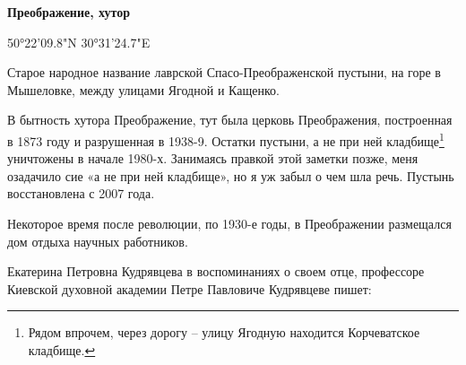 \medskip


\textbf{Преображение, хутор} 

50°22'09.8"N 30°31'24.7"E

Старое народное название лаврской Спасо-Преображенской пустыни, на горе в Мышеловке, между улицами Ягодной и Кащенко. 

В бытность хутора Преображение, тут была церковь Преображения, построенная в 1873 году и разрушенная в 1938-9. Остатки пустыни, а не при ней кладбище\footnote{Рядом впрочем, через дорогу – улицу Ягодную находится Корчеватское кладбище.} уничтожены в начале 1980-х. Занимаясь правкой этой заметки позже, меня озадачило сие «а не при ней кладбище», но я уж забыл о чем шла речь. Пустынь восстановлена с 2007 года.

Некоторое время после революции, по 1930-е годы, в Преображении размещался дом отдыха научных работников.

Екатерина Петровна Кудрявцева в воспоминаниях о своем отце, профессоре Киевской духовной академии Петре Павловиче Кудрявцеве пишет:

